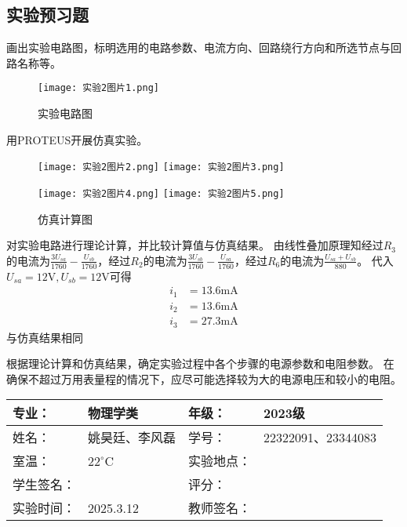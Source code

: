 \documentclass[dvipsnames, svgnames,a4paper,11pt]{article}
\begin{document}
\subsection{实验预习题}
\begin{question}
    画出实验电路图，标明选用的电路参数、电流方向、回路绕行方向和所选节点与回路名称等。
    \tcblower
    \begin{figure}[H]
        \centering
        \texttt{[image: 实验2图片1.png]}
        \caption{实验电路图}
    \end{figure}
\end{question}

\begin{question}
    用PROTEUS开展仿真实验。
    \tcblower
    \begin{figure}[H]
        \centering
        \texttt{[image: 实验2图片2.png]}
        \texttt{[image: 实验2图片3.png]}
        
    \end{figure}
    \begin{figure}[H]
        \centering
        \texttt{[image: 实验2图片4.png]}
        \texttt{[image: 实验2图片5.png]}
        \caption{仿真计算图}
    \end{figure}
\end{question}
\begin{question}
    对实验电路进行理论计算，并比较计算值与仿真结果。
    \tcblower
    由线性叠加原理知经过$R_3$的电流为$\frac{3U_{sa}}{1760}-\frac{U_{sb}}{1760}$，经过$R_2$的电流为$\frac{3U_{sb}}{1760}-\frac{U_{sa}}{1760}$，经过$R_6$的电流为$\frac{U_{sa}+U_{sb}}{880}$。
    代入$U_{sa}=12\text{V},U_{sb}=12\text{V}$可得
    \begin{align*}
        i_1&=13.6\text{mA}\\
        i_2&=13.6\text{mA}\\
        i_3&=27.3\text{mA}
    \end{align*}
    与仿真结果相同
\end{question}


\begin{question}
    根据理论计算和仿真结果，确定实验过程中各个步骤的电源参数和电阻参数。
    \tcblower
    在确保不超过万用表量程的情况下，应尽可能选择较为大的电源电压和较小的电阻。
\end{question}
\clearpage
{}
\begin{table}
	\renewcommand\arraystretch{1.7}
	\centering
	\begin{tabularx}{\textwidth}{|X|X|X|X|}
	\hline
	专业：& 物理学类 &年级：& 2023级 \\
	\hline
	姓名：& 姚昊廷、李风磊 & 学号：&22322091、23344083\\
	\hline
	室温：&$22^\circ$C&实验地点：&\\
	\hline
	学生签名：& & 评分： &\\
	\hline
	实验时间：&2025.3.12  & 教师签名：&\\
	\hline
	\end{tabularx}
\end{table}
\end{document}
